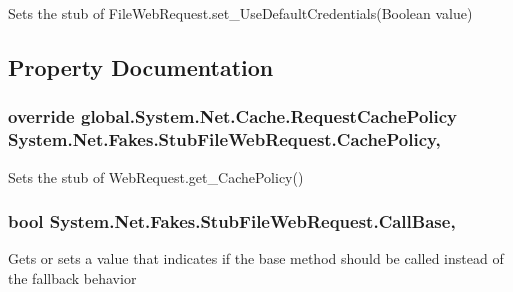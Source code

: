 Sets the stub of File\-Web\-Request.\-set\-\_\-\-Use\-Default\-Credentials(\-Boolean value)



\subsection{Property Documentation}
\hypertarget{class_system_1_1_net_1_1_fakes_1_1_stub_file_web_request_a94c7beed3e83de5af05d25766ffac0f8}{
\subsubsection[{Cache\-Policy}]{\setlength{\rightskip}{0pt plus 5cm}override global.\-System.\-Net.\-Cache.\-Request\-Cache\-Policy System.\-Net.\-Fakes.\-Stub\-File\-Web\-Request.\-Cache\-Policy\hspace{0.3cm}{\ttfamily [get]}, {\ttfamily [set]}}}\label{class_system_1_1_net_1_1_fakes_1_1_stub_file_web_request_a94c7beed3e83de5af05d25766ffac0f8}


Sets the stub of Web\-Request.\-get\-\_\-\-Cache\-Policy()

\hypertarget{class_system_1_1_net_1_1_fakes_1_1_stub_file_web_request_a5c4c12c0c722bac1fb1f84f057edbea3}{
\subsubsection[{Call\-Base}]{\setlength{\rightskip}{0pt plus 5cm}bool System.\-Net.\-Fakes.\-Stub\-File\-Web\-Request.\-Call\-Base\hspace{0.3cm}{\ttfamily [get]}, {\ttfamily [set]}}}\label{class_system_1_1_net_1_1_fakes_1_1_stub_file_web_request_a5c4c12c0c722bac1fb1f84f057edbea3}


Gets or sets a value that indicates if the base method should be called instead of the fallback behavior

